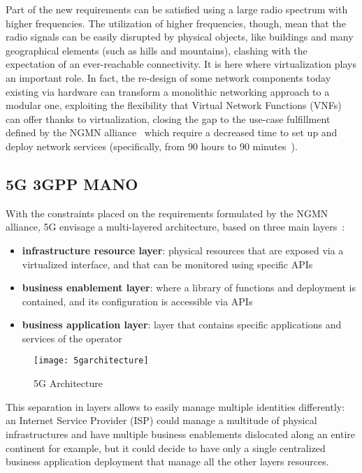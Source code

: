 Part of the new requirements can be satisfied using a large radio spectrum with
higher frequencies. The utilization of higher frequencies, though, mean that the
radio signals can be easily disrupted by physical objects, like buildings and
many geographical elements (such as hills and mountains), clashing with the
expectation of an ever-reachable connectivity. It is here where virtualization
plays an important role. In fact, the re-design of some network components today
existing via hardware can transform a monolithic networking approach to a 
modular one, exploiting the flexibility that Virtual Network Functions 
(VNFs)\cite{moens2014vnf} can offer thanks to virtualization, closing the gap to
the use-case fulfillment defined by the NGMN alliance~\cite{iwamura2015ngmn}
which require a decreased time to set up and deploy network services
(specifically, from 90 hours to 90 minutes~\cite{networld20202014role}).

\subsection{5G 3GPP MANO}

With the constraints placed on the requirements formulated by the NGMN alliance,
5G envisage a multi-layered architecture, based on three main
layers~\cite{alliance20155g}:
\begin{itemize}
\item \textbf{infrastructure resource layer}: physical resources that are 
exposed via a virtualized interface, and that can be monitored using specific 
APIs
\item \textbf{business enablement layer}: where a library of functions and
  deployment is contained, and its configuration is accessible via APIs
\item \textbf{business application layer}: layer that contains specific
  applications and services of the operator
\end{itemize}

\begin{figure}[t]
  \centering
  \texttt{[image: 5garchitecture]}
  \caption[5G Architecture]{5G Architecture~\cite{alliance20155g}}
  \label{chap:background:img:5garchitecture}
\end{figure}

This separation in layers allows to easily manage multiple identities 
differently: an Internet Service Provider (ISP) could manage a multitude of 
physical infrastructures and have multiple business enablements dislocated 
along an entire continent for example, but it could decide to have only a 
single centralized business application deployment that manage all the other 
layers resources.

